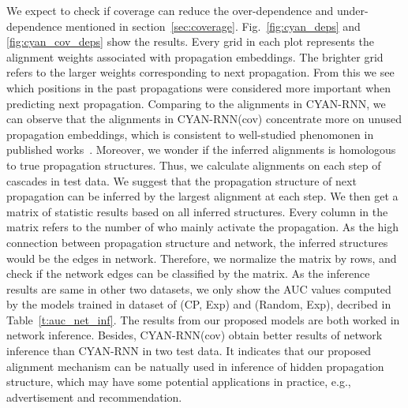 We expect to check if coverage can reduce the over-dependence and
under-dependence mentioned in section~\ref{sec:coverage}.
Fig.~\ref{fig:cyan_deps} and \ref{fig:cyan_cov_deps} show the results. Every grid
in each plot represents the alignment weights associated with propagation
embeddings.
The brighter grid refers to the larger weights corresponding to next
propagation. From this we see which positions in the past propagations
were considered more important when predicting next propagation. Comparing to
the alignments in CYAN-RNN, we can observe that the alignments in CYAN-RNN(cov)
concentrate more on unused propagation embeddings, which is consistent to
well-studied phenomonen in published works~\cite{}. Moreover, we wonder if the
inferred alignments is homologous to true propagation structures. Thus, we
calculate alignments on each step of cascades in test data. We suggest that the
propagation structure of next propagation can be inferred by the largest
alignment at each step. We then get a matrix of statistic results based on all inferred
structures. Every column in the matrix refers to the number of who mainly
activate the propagation. As the high connection between propagation
structure and network, the inferred structures would be the edges in
network. Therefore, we normalize the matrix by rows, and check if the
network edges can be classified by the matrix. As the
inference results are same in other two datasets, we only show the AUC values
computed by the models trained in dataset of (CP, Exp) and (Random, Exp),
decribed in Table~\ref{t:auc_net_inf}. The results from our proposed models
are both worked in network inference. Besides, CYAN-RNN(cov) obtain better results of
network inference than CYAN-RNN in two test data. It indicates that our
proposed alignment mechanism can be natually used in inference of hidden
propagation structure, which may have some potential applications in practice,
e.g., advertisement and recommendation.


\begin{figure}
\centering
{}
\caption{
}
\end{figure}

